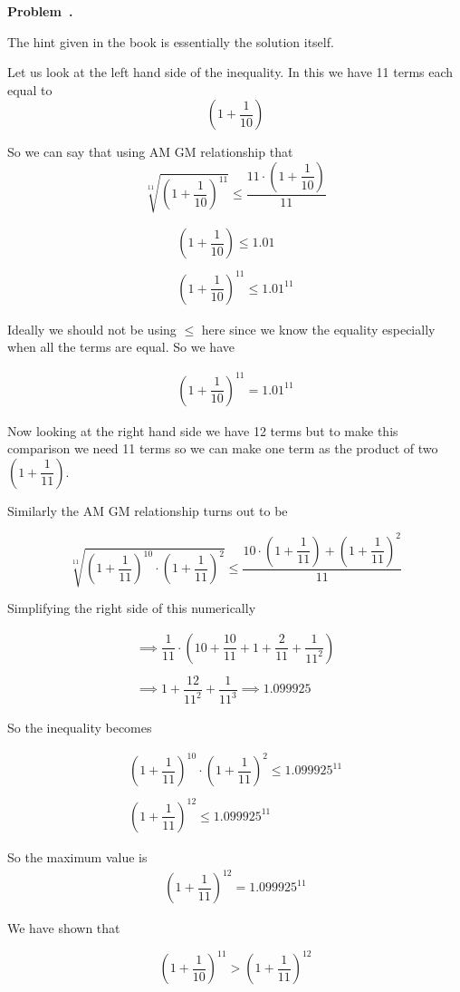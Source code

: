 \documentclass[10pt]{article}
\newcounter{problem}
\newenvironment{problem}[1][]{
  \refstepcounter{problem}
  \par\noindent\textbf{Problem~\theproblem. #1}\par
  \vspace{0.5em}
}{\vspace{1em}}
\begin{document}
\begin{problem} %
  The hint given in the book is essentially the solution itself.

  Let us look at the left hand side of the inequality. In this we have 11 terms each equal to
  \[
  \left(1 + \dfrac{1}{10}\right)
  \]

  So we can say that using AM GM relationship that 
  \[
  \sqrt[11]{\left(1 + \dfrac{1}{10}\right)^{11}} \le \dfrac{11 \cdot \left(1 + \dfrac{1}{10}\right)}{11}
  \]

  \begin{gather*}
    \left(1 + \dfrac{1}{10}\right) \le 1.01\\\\
    \left(1 + \dfrac{1}{10}\right)^{11} \le 1.01^{11}
  \end{gather*}

  Ideally we should not be using $\le$ here since we know the equality especially when all the terms are equal. So we have 

  \begin{gather*}
    \left(1 + \dfrac{1}{10}\right)^{11} = 1.01^{11}
  \end{gather*}

  Now looking at the right hand side we have 12 terms but to make this comparison we need 11 terms so we can make one term as the 
  product of two $\left(1 + \dfrac{1}{11}\right)$. 

  Similarly the AM GM relationship turns out to be

  \[
  \sqrt[11]{\left(1 + \dfrac{1}{11}\right)^{10} \cdot \left(1 + \dfrac{1}{11}\right)^2} \le \dfrac{10 \cdot \left(1 + \dfrac{1}{11}\right) + \left(1 + \dfrac{1}{11}\right)^2}{11}
  \]

  Simplifying the right side of this numerically 

  \begin{gather*}
    \implies \dfrac{1}{11} \cdot \left(10 + \dfrac{10}{11} + 1 + \dfrac{2}{11} + \dfrac{1}{11^2}\right)\\\\
    \implies 1 + \dfrac{12}{11^2} + \dfrac{1}{11^3}
    \implies 1.099925
  \end{gather*}

  So the inequality becomes 

  \begin{gather*}
    \left(1 + \dfrac{1}{11}\right)^{10} \cdot \left(1 + \dfrac{1}{11}\right)^2 \le 1.099925^{11}\\\\
    \left(1 + \dfrac{1}{11}\right)^{12} \le 1.099925^{11}
  \end{gather*}

  So the maximum value is 
   \begin{gather*}
    \left(1 + \dfrac{1}{11}\right)^{12} = 1.099925^{11}
  \end{gather*}

  We have shown that 

  \[
  \left(1 + \dfrac{1}{10}\right)^{11} > \left(1 + \dfrac{1}{11}\right)^{12}
  \]

\end{problem}
\end{document}
